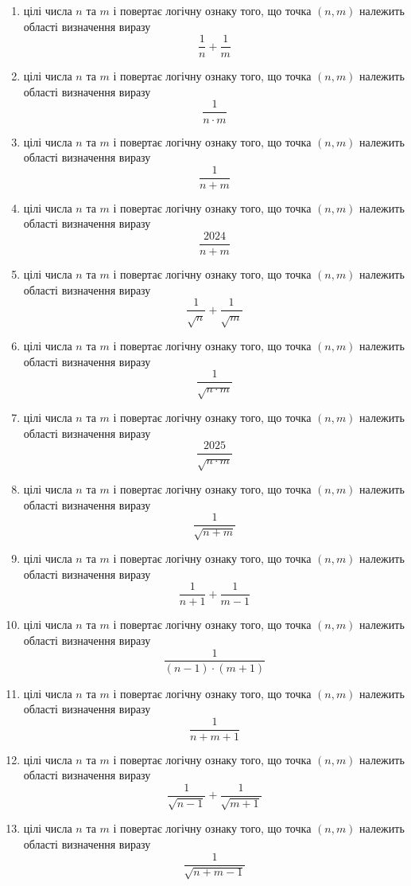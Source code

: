 \documentclass[12pt,a4paper]{article}
\begin{document}
\begin{enumerate}
    \item цілі числа $n$ та $m$ і повертає логічну ознаку того, що точка $(n, m)$ належить області визначення виразу $$\frac{1}{n} + \frac{1}{m}$$
    \item цілі числа $n$ та $m$ і повертає логічну ознаку того, що точка $(n, m)$ належить області визначення виразу $$\frac{1}{n \cdot m}$$
    \item цілі числа $n$ та $m$ і повертає логічну ознаку того, що точка $(n, m)$ належить області визначення виразу $$\frac{1}{n + m}$$
    \item цілі числа $n$ та $m$ і повертає логічну ознаку того, що точка $(n, m)$ належить області визначення виразу $$\frac{2024}{n + m}$$
    \item цілі числа $n$ та $m$ і повертає логічну ознаку того, що точка $(n, m)$ належить області визначення виразу $$\frac{1}{\sqrt{n}} + \frac{1}{\sqrt{m}}$$
    \item цілі числа $n$ та $m$ і повертає логічну ознаку того, що точка $(n, m)$ належить області визначення виразу $$\frac{1}{\sqrt{n \cdot m}}$$
    \item цілі числа $n$ та $m$ і повертає логічну ознаку того, що точка $(n, m)$ належить області визначення виразу $$\frac{2025}{\sqrt{n \cdot m}}$$
    \item цілі числа $n$ та $m$ і повертає логічну ознаку того, що точка $(n, m)$ належить області визначення виразу $$\frac{1}{\sqrt{n + m}}$$
    
    \item цілі числа $n$ та $m$ і повертає логічну ознаку того, що точка $(n, m)$ належить області визначення виразу $$\frac{1}{n+1} + \frac{1}{m-1}$$
    \item цілі числа $n$ та $m$ і повертає логічну ознаку того, що точка $(n, m)$ належить області визначення виразу $$\frac{1}{(n-1) \cdot (m+1)}$$
    \item цілі числа $n$ та $m$ і повертає логічну ознаку того, що точка $(n, m)$ належить області визначення виразу $$\frac{1}{n + m + 1}$$
    \item цілі числа $n$ та $m$ і повертає логічну ознаку того, що точка $(n, m)$ належить області визначення виразу $$\frac{1}{\sqrt{n-1}} + \frac{1}{\sqrt{m+1}}$$
    \item цілі числа $n$ та $m$ і повертає логічну ознаку того, що точка $(n, m)$ належить області визначення виразу $$\frac{1}{\sqrt{n + m - 1}}$$
    

\end{enumerate}
\end{document}
